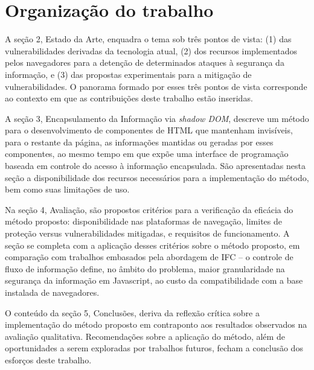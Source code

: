 \section{Organização do trabalho}


A seção 2, Estado da Arte, enquadra o tema sob três pontos de vista: (1) das vulnerabilidades derivadas da tecnologia atual, (2) dos recursos implementados pelos navegadores para a detenção de determinados ataques à segurança da informação, e (3) das propostas experimentais para a mitigação de vulnerabilidades. O panorama formado por esses três pontos de vista corresponde ao contexto em que as contribuições deste trabalho estão inseridas.

A seção 3, Encapsulamento da Informação via \textit{shadow DOM}, descreve um método para o desenvolvimento de componentes de HTML que mantenham invisíveis, para o restante da página, as informações mantidas ou geradas por esses componentes, ao mesmo tempo em que expõe uma interface de programação baseada em controle do acesso à informação encapsulada. São apresentadas nesta seção a disponibilidade dos recursos necessários para a implementação do método, bem como suas limitações de uso.

Na seção 4, Avaliação, são propostos critérios para a verificação da eficácia do método proposto: disponibilidade nas plataformas de navegação, limites de proteção versus vulnerabilidades mitigadas, e requisitos de funcionamento. A seção se completa com a aplicação desses critérios sobre o método proposto, em comparação com trabalhos embasados pela abordagem de IFC -- o controle de fluxo de informação define, no âmbito do problema, maior granularidade na segurança da informação em Javascript, ao custo da compatibilidade com a base instalada de navegadores.

O conteúdo da seção 5, Conclusões, deriva da reflexão crítica sobre a implementação do método proposto em contraponto aos resultados observados na avaliação qualitativa. Recomendações sobre a aplicação do método, além de oportunidades a serem exploradas por trabalhos futuros, fecham a conclusão dos esforços deste trabalho.